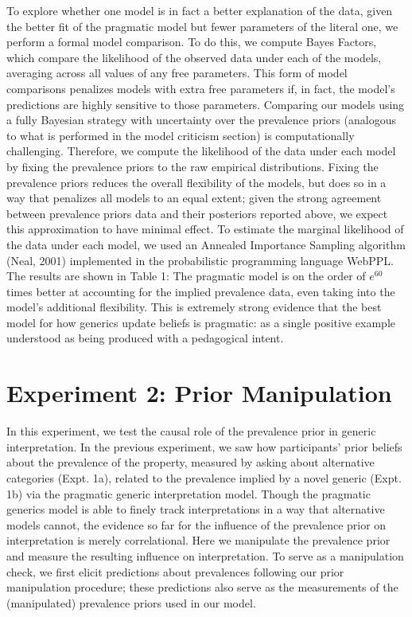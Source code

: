 \documentclass[floatsintext,doc]{apa6}
\begin{document}
To explore whether one model is in fact a better explanation of the data, given the better fit of the pragmatic model but fewer parameters of the literal one, we perform a formal model comparison.
To do this, we compute Bayes Factors, which compare the likelihood of the observed data under each of the models, averaging across all values of any free parameters.
This form of model comparisons penalizes models with extra free parameters if, in fact, the model's predictions are highly sensitive to those parameters.
Comparing our models using a fully Bayesian strategy with uncertainty over the prevalence priors (analogous to what is performed in the model criticism section) is computationally challenging.
Therefore, we compute the likelihood of the data under each model by fixing the prevalence priors to the raw empirical distributions. Fixing the prevalence priors reduces the overall flexibility of the models, but does so in a way that penalizes all models to an equal extent; given the strong agreement between prevalence priors data and their posteriors reported above, we expect this approximation to have minimal effect.
To estimate the marginal likelihood of the data under each model, we used an Annealed Importance Sampling algorithm (Neal, 2001) implemented in the probabilistic programming language WebPPL.
The results are shown in Table 1: The pragmatic model is on the order of \(e^{60}\) times better at accounting for the implied prevalence data, even taking into the model's additional flexibility.
This is extremely strong evidence that the best model for how generics update beliefs is pragmatic: as a single positive example understood as being produced with a pedagogical intent.



\hypertarget{experiment-2-prior-manipulation}{%
\section{Experiment 2: Prior Manipulation}\label{experiment-2-prior-manipulation}}

In this experiment, we test the causal role of the prevalence prior in generic interpretation.
In the previous experiment, we saw how participants' prior beliefs about the prevalence of the property, measured by asking about alternative categories (Expt. 1a), related to the prevalence implied by a novel generic (Expt. 1b) via the pragmatic generic interpretation model.
Though the pragmatic generics model is able to finely track interpretations in a way that alternative models cannot, the evidence so far for the influence of the prevalence prior on interpretation is merely correlational.
Here we manipulate the prevalence prior and measure the resulting influence on interpretation.
To serve as a manipulation check, we first elicit predictions about prevalences following our prior manipulation procedure; these predictions also serve as the measurements of the (manipulated) prevalence priors used in our model.
\end{document}
